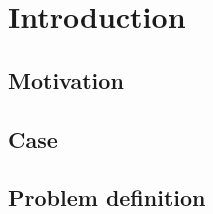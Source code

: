 \section{Introduction}
\label{introduction}

\subsection{Motivation} %

\subsection{Case} %

\subsection{Problem definition} %

